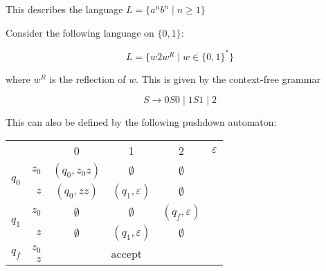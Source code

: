 This describes the language \(L=\{a^n b^n\mid n\geq1\} \)

Consider the following language on \( \{0, 1\} \):

\[L=\{w2w^R \mid w\in {\{0, 1\}}^*\} \]

where \(w^R\) is the reflection of \(w\). This is given by the context-free grammar 

\[S\to 0S0\mid 1S1\mid 2\]

This can also be defined by the following pushdown automaton:

\begin{center}\begin{tabular}{l r c c c c}
    & & 0 & 1 & 2 & \(\varepsilon \) \\\cmidrule{3-6}
    \multirow{2}{*}{\(q_0\)} & \(z_0\) & \((q_0, z_0z)\) & \(\emptyset \) & \(\emptyset \) \\
    & \(z\) & \((q_0, zz)\)  & \((q_1, \varepsilon) \) & \(\emptyset \) \\\midrule
    \multirow{2}{*}{\(q_1\)} & \(z_0\) & \(\emptyset \) & \(\emptyset \) & \((q_f, \varepsilon)\) \\
    & \(z\) & \(\emptyset \) & \((q_1, \varepsilon)\) & \(\emptyset \) \\\midrule
    \multirow{2}{*}{\(q_f\)} & \(z_0\) & \multicolumn{3}{c}{\multirow{2}{*}{accept}}\\
    & \(z\) & & &\\
\end{tabular}\end{center}